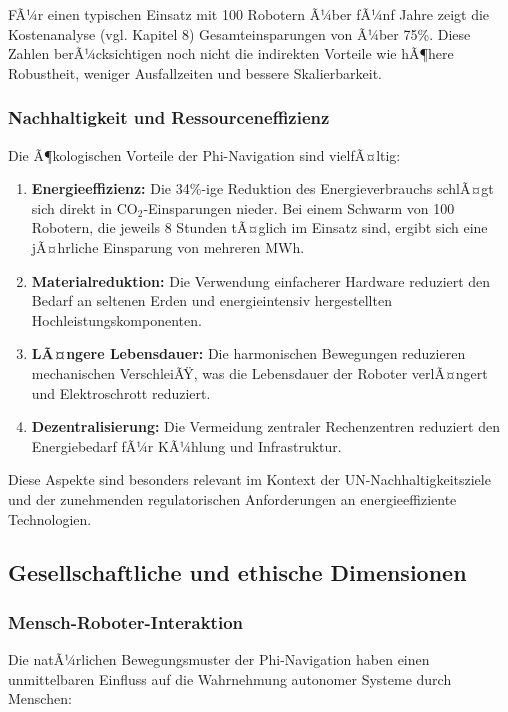 ﻿\documentclass[a4paper,12pt]{article}
\theoremstyle{definition}
\begin{document}
FÃ¼r einen typischen Einsatz mit 100 Robotern Ã¼ber fÃ¼nf Jahre zeigt die Kostenanalyse (vgl. Kapitel 8) Gesamteinsparungen von Ã¼ber 75\%. Diese Zahlen berÃ¼cksichtigen noch nicht die indirekten Vorteile wie hÃ¶here Robustheit, weniger Ausfallzeiten und bessere Skalierbarkeit.

\subsubsection{Nachhaltigkeit und Ressourceneffizienz}

Die Ã¶kologischen Vorteile der Phi-Navigation sind vielfÃ¤ltig:

\begin{enumerate}
	\item \textbf{Energieeffizienz:} Die 34\%-ige Reduktion des Energieverbrauchs schlÃ¤gt sich direkt in CO$_2$-Einsparungen nieder. Bei einem Schwarm von 100 Robotern, die jeweils 8 Stunden tÃ¤glich im Einsatz sind, ergibt sich eine jÃ¤hrliche Einsparung von mehreren MWh.
	
	\item \textbf{Materialreduktion:} Die Verwendung einfacherer Hardware reduziert den Bedarf an seltenen Erden und energieintensiv hergestellten Hochleistungskomponenten.
	
	\item \textbf{LÃ¤ngere Lebensdauer:} Die harmonischen Bewegungen reduzieren mechanischen VerschleiÃŸ, was die Lebensdauer der Roboter verlÃ¤ngert und Elektroschrott reduziert.
	
	\item \textbf{Dezentralisierung:} Die Vermeidung zentraler Rechenzentren reduziert den Energiebedarf fÃ¼r KÃ¼hlung und Infrastruktur.
\end{enumerate}

Diese Aspekte sind besonders relevant im Kontext der UN-Nachhaltigkeitsziele und der zunehmenden regulatorischen Anforderungen an energieeffiziente Technologien.

\subsection{Gesellschaftliche und ethische Dimensionen}

\subsubsection{Mensch-Roboter-Interaktion}

Die natÃ¼rlichen Bewegungsmuster der Phi-Navigation haben einen unmittelbaren Einfluss auf die Wahrnehmung autonomer Systeme durch Menschen:
\end{document}
